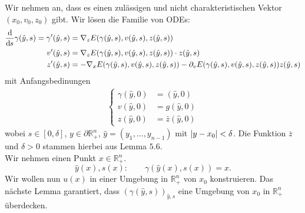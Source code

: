 Wir nehmen an, dass es einen zulässigen und nicht charakteristischen Vektor $(x_0,v_0,z_0)$ gibt. Wir lösen die Familie von ODEs:
\begin{align*}
	\frac{\mathrm{d}\mkern-1.0mu }{\mathrm{d}\mkern-1.0mu s}  \gamma(\hat{y},s) = \gamma' ( \hat{y}, s) &=  \nabla _z E(\gamma(\hat{y},s),v(\hat{y},s),z(\hat{y},s)) \\
	v'(\hat{y},s) &=  \nabla _z E(\gamma(\hat{y},s),v(\hat{y},s),z(\hat{y},s)) \cdot z(\hat{y},s) \\
	z'(\hat{y},s) &= -  \nabla_x E( \gamma(\hat{y},s),v(\hat{y},s),z(\hat{y},s))- \partial_v E(\gamma(\hat{y},s),v(\hat{y},s),z(\hat{y},s))z(\hat{y},s)
\end{align*}
mit Anfangsbedinungen
\begin{align*}
	\begin{cases}
		\gamma(\hat{y},0) &= (\hat{y},0) \\
		v(\hat{y},0) &= g(\hat{y},0) \\
		z(\hat{y},0) &= \bar{z}(\hat{y},0)
	\end{cases}
\end{align*}
wobei $s \in [0,\delta ]$, $y \in  \partial \mathbb{R}^n_+$, $\hat{y} = (y_1, \dots, y_{n-1})$ mit $\lvert y-x_0\rvert < \delta$. Die Funktion $\bar{z}$ und $\delta >0$ stammen hierbei aus Lemma $5.6$. \\
Wir nehmen einen Punkt $x \in \mathbb{R}^n_+$. \[
	\hat{y}(x), s(x): \qquad \gamma(\hat{y}(x),s(x)) = x.
\]
Wir wollen nun $u(x)$ in einer Umgebung in $\mathbb{R}^n_+$ von $x_0$ konstruieren. Das nächste Lemma garantiert, dass $(\gamma(\hat{y},s))_{\hat{y},s}$ eine Umgebung von $x_0$ in $\mathbb{R}^n_+$ überdecken. 

